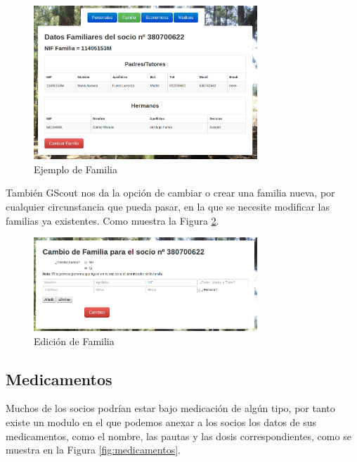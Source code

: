 \begin{figure}[H]
\begin{center}
\includegraphics[width=0.75\textwidth]{images/familia_socio.jpg}
\caption{Ejemplo de Familia}
\label{fig:familia}
\end{center}
\end{figure}

También GScout nos da la opción de cambiar o crear una familia nueva, por cualquier circunstancia que pueda pasar, en la que se necesite modificar las familias ya existentes.
Como muestra la Figura \ref{fig:edit_familia}.\\

\begin{figure}[H]
\begin{center}
\includegraphics[width=0.75\textwidth]{images/cambio_familia.jpg}
\caption{Edición de Familia}
\label{fig:edit_familia}
\end{center}
\end{figure}


\subsection{Medicamentos}

Muchos de los socios podrían estar bajo medicación de algún tipo, por tanto existe un modulo en el que podemos anexar a los socios los datos de sus medicamentos, como el nombre, las pautas y las dosis correspondientes, 
como se muestra en la Figura \ref{fig:medicamentos}.\\

